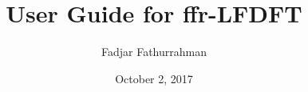 \documentclass[a4paper,11pt,fleqn]{article}
\begin{document}
\title{User Guide for {\ttfamily ffr-LFDFT}}
\author{Fadjar Fathurrahman}
\date{October 2, 2017}
\maketitle

\tableofcontents







\appendix






\end{document}
